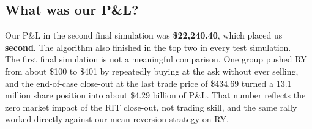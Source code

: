 \documentclass{article}
\begin{document}
\subsection{What was our P\&L?}

Our P\&L in the second final simulation was \textbf{\$22{,}240.40}, which placed us \textbf{second}. The algorithm also finished in the top two in every test simulation.\\

\noindent The first final simulation is not a meaningful comparison. One group pushed RY from about \$100 to \$401 by repeatedly buying at the ask without ever selling, and the end-of-case close-out at the last trade price of \$434.69 turned a 13.1 million share position into about \$4.29 billion of P\&L. That number reflects the zero market impact of the RIT close-out, not trading skill, and the same rally worked directly against our mean-reversion strategy on RY.
\end{document}
